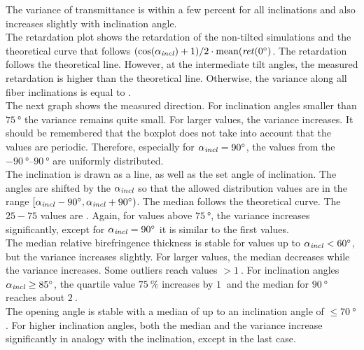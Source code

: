 The variance of transmittance is within a few percent for all inclinations and also increases slightly with inclination angle.
\\
% 
The retardation plot shows the retardation of the non-tilted simulations and the theoretical curve that follows $(\cos(\textnormal{$\alpha_{\mathit{incl}}$}) + 1) / 2 \cdot \mathrm{mean}(\mathit{ret}(\SI{0}{\degree})$.
The retardation follows the theoretical line.
However, at the intermediate tilt angles, the measured retardation is higher than the theoretical line.
Otherwise, the variance along all fiber inclinations is equal to \modelInc{}.
\\
% 
The next graph shows the measured direction.
For inclination angles smaller than $\SI{75}{\degree}$ the variance remains quite small.
For larger values, the variance increases.
It should be remembered that the boxplot does not take into account that the values are periodic.
Therefore, especially for $\textnormal{$\alpha_{\mathit{incl}}$}=\SI{90}{\degree}$, the values from the $\SIrange{-90}{90}{\degree}$ are uniformly distributed.
\\
% 
The inclination is drawn as a line, as well as the set angle of inclination.
The angles are shifted by the $\textnormal{$\alpha_{\mathit{incl}}$}$ so that the allowed distribution values are in the range $[\textnormal{$\alpha_{\mathit{incl}}$}-\SI{90}{\degree}, \textnormal{$\alpha_{\mathit{incl}}$}+\SI{90}{\degree})$.
The median follows the theoretical curve.
The $25-75$ values are \dummy{} .
Again, for values above $\SI{75}{\degree}$, the variance increases significantly, except for $\textnormal{$\alpha_{\mathit{incl}}$} = \SI{90}{\degree}$ it is similar to the first values.
\\
% 
The median relative birefringence thickness \trel{} is stable for values up to $\textnormal{$\alpha_{\mathit{incl}}$} < \SI{60}{\degree}$, but the variance increases slightly.
For larger values, the median decreases while the variance increases.
Some outliers reach values $>\SI{1}{}$.
For inclination angles $\textnormal{$\alpha_{\mathit{incl}}$} \ge \SI{85}{\degree}$, the quartile value $\SI{75}{\percent}$ increases by $\SI{1}{}$ and the median for $\SI{90}{\degree}$ reaches about $\SI{2}{}$.
\\
% 
The opening angle \modelDOmega{} is stable with a median of \dummy{} up to an inclination angle of $\le \SI{70}{\degree}$.
For higher inclination angles, both the median and the variance increase significantly in analogy with the inclination, except in the last case.
% 
% 
% 
